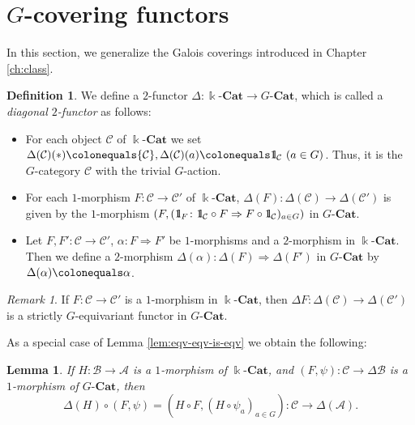 \documentclass{surv-l}
\numberwithin{equation}{chapter}
\numberwithin{figure}{chapter}
\theoremstyle{plain}
\newtheorem{lem}[thm]{Lemma}
\theoremstyle{definition}
\newtheorem{dfn}[thm]{Definition}
\theoremstyle{remark}
\newtheorem{rmk}[thm]{Remark}
\newcommand{\id}{1\kern-.25em{\text{{\rm l}}}}
\newcommand{\kCat}{\Bbbk\text{-}\mathbf{Cat}}
\newcommand{\GCat}{G\text{-}\mathbf{Cat}}
\begin{document}
\section{$G$-covering functors}In this section, we generalize the Galois coverings introduced in Chapter \ref{ch:class}.

\begin{dfn}
We define a $2$-functor $\Delta \colon \kCat \to \GCat$, which is called
a \emph{diagonal $2$-functor} as follows:
\begin{itemize}
\item
For each object ${\mathcal{C}}$ of $\kCat$ we set
$\Delta({\mathcal{C}})(*)\colonequals  {\mathcal{C}}, \Delta({\mathcal{C}})(a)\colonequals \id_{\mathcal{C}} \ (a\in G)$.
Thus, it is the $G$-category ${\mathcal{C}}$ with the trivial $G$-action.
\item
For each $1$-morphism
$F \colon {\mathcal{C}} \to {\mathcal{C}}'$ of $\kCat$,
$\Delta(F) \colon \Delta({\mathcal{C}}) \to \Delta({\mathcal{C}}')$ is given by the $1$-morphism
$(F, (\id_F \colon \id_{\mathcal{C}} \circ F \Rightarrow F \circ \id_{\mathcal{C}})_{a \in G})$
in $\GCat$.
\item
Let $F, F' \colon {\mathcal{C}} \to {\mathcal{C}}'$, $\alpha \colon F \Rightarrow F'$ be
$1$-morphisms and a $2$-morphism in $\kCat$.
Then we define a $2$-morphism $\Delta(\alpha) \colon \Delta(F) \Rightarrow \Delta(F')$
in $\GCat$ by $\Delta(\alpha)\colonequals  \alpha$.
\end{itemize}
\end{dfn}

\begin{rmk}
If $F\colon {\mathcal{C}} \to {\mathcal{C}}'$ is a $1$-morphism in $\kCat$,
then $\Delta F \colon \Delta({\mathcal{C}}) \to \Delta({\mathcal{C}}')$ is a strictly $G$-equivariant functor
in $\GCat$.
\end{rmk}

As a special case of Lemma \ref{lem:eqv-eqv-is-eqv} we obtain the following:

\begin{lem}
\label{lem:compn-of-inv-and-fun}
If $H\colon\mathcal{B}\to\mathcal{A}$ is a $1$-morphism of $\kCat$, and
$(F,\psi)\colon{\mathcal{C}}\to\Delta\mathcal{B}$ is a $1$-morphism of $\GCat$, then
\begin{equation*}
\Delta(H) \circ (F,\psi)=(H \circ F,(H \circ\psi_{a})_{a\in G})\colon{\mathcal{C}}\to\Delta(\mathcal{A}).
\end{equation*}
\end{lem}
\end{document}
